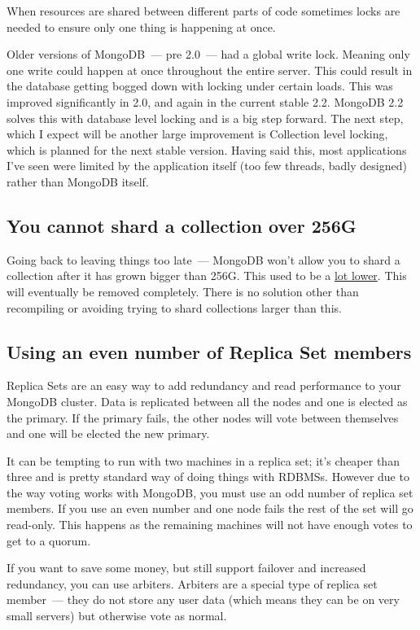 When resources are shared between different parts of code sometimes locks are needed to ensure only one thing is happening at once.

Older versions of MongoDB~--- pre 2.0~--- had a global write lock. Meaning only one write could happen at once throughout the entire server. This could result in the database getting bogged down with locking under certain loads. This was improved significantly in 2.0, and again in the current stable 2.2. MongoDB 2.2 solves this with database level locking and is a big step forward. The next step, which I expect will be another large improvement is Collection level locking, which is planned for the next stable version.
Having said this, most applications I’ve seen were limited by the application itself (too few threads, badly designed) rather than MongoDB itself.

\subsection{You cannot shard a collection over 256G}

Going back to leaving things too late~--- MongoDB won't allow you to shard a collection after it has grown bigger than 256G. This used to be a \href{https://jira.mongodb.org/browse/SERVER-2271}{lot lower}. This will eventually be removed completely. There is no solution other than recompiling or avoiding trying to shard collections larger than this.

\subsection{Using an even number of Replica Set members}

Replica Sets are an easy way to add redundancy and read performance to your MongoDB cluster. Data is replicated between all the nodes and one is elected as the primary. If the primary fails, the other nodes will vote between themselves and one will be elected the new primary.

It can be tempting to run with two machines in a replica set; it's cheaper than three and is pretty standard way of doing things with RDBMSs.
However due to the way voting works with MongoDB, you must use an odd number of replica set members. If you use an even number and one node fails the rest of the set will go read-only. This happens as the remaining machines will not have enough votes to get to a quorum.

If you want to save some money, but still support failover and increased redundancy, you can use arbiters. Arbiters are a special type of replica set member~--- they do not store any user data (which means they can be on very small servers) but otherwise vote as normal.

